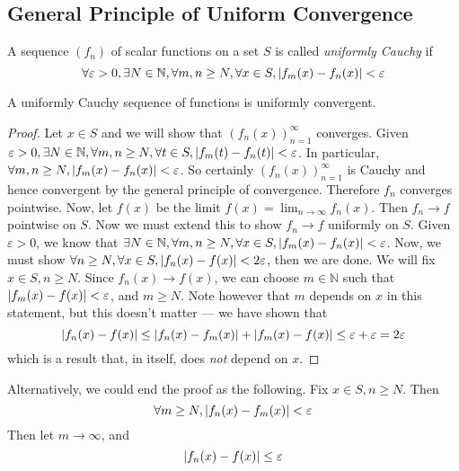\subsection{General Principle of Uniform Convergence}
\begin{definition}
	A sequence \( (f_n) \) of scalar functions on a set \( S \) is called \textit{uniformly Cauchy} if
	\[
		\forall \varepsilon > 0, \exists N \in \mathbb N, \forall m, n \geq N, \forall x \in S, \abs{f_m(x) - f_n(x)} < \varepsilon
	\]
\end{definition}
\begin{theorem}
	A uniformly Cauchy sequence of functions is uniformly convergent.
\end{theorem}
\begin{proof}
	Let \( x \in S \) and we will show that \( (f_n(x))_{n=1}^\infty \) converges.
	Given \( \varepsilon > 0, \exists N \in \mathbb N, \forall m, n \geq N, \forall t \in S, \abs{f_m(t) - f_n(t)} < \varepsilon \).
	In particular, \( \forall m,n \geq N, \abs{f_m(x) - f_n(x)} < \varepsilon \).
	So certainly \( (f_n(x))_{n=1}^\infty \) is Cauchy and hence convergent by the general principle of convergence.
	Therefore \( f_n \) converges pointwise.
	Now, let \( f(x) \) be the limit \( f(x) = \lim_{n\to\infty} f_n(x) \).
	Then \( f_n \to f \) pointwise on \( S \).
	Now we must extend this to show \( f_n \to f \) uniformly on \( S \).
	Given \( \varepsilon > 0 \), we know that \( \exists N \in \mathbb N, \forall m, n \geq N, \forall x \in S, \abs{f_m(x) - f_n(x)} < \varepsilon \).
	Now, we must show \( \forall n \geq N, \forall x \in S, \abs{f_n(x) - f(x)} < 2 \varepsilon \), then we are done.
	We will fix \( x \in S, n \geq N \).
	Since \( f_n(x) \to f(x) \), we can choose \( m \in \mathbb N \) such that \( \abs{f_m(x) - f(x)} < \varepsilon \), and \( m \geq N \).
	Note however that \( m \) depends on \( x \) in this statement, but this doesn't matter --- we have shown that
	\[
		\abs{f_n(x) - f(x)} \leq \abs{f_n(x) - f_m(x)} + \abs{f_m(x) - f(x)} \leq \varepsilon + \varepsilon = 2 \varepsilon
	\]
	which is a result that, in itself, does \textit{not} depend on \( x \).
\end{proof}
\begin{note}
	Alternatively, we could end the proof as the following.
	Fix \( x \in S, n \geq N \).
	Then
	\[
		\forall m \geq N, \abs{f_n(x) - f_m(x)} < \varepsilon
	\]
	Then let \( m \to \infty \), and
	\[
		\abs{f_n(x) - f(x)} \leq \varepsilon
	\]
\end{note}

